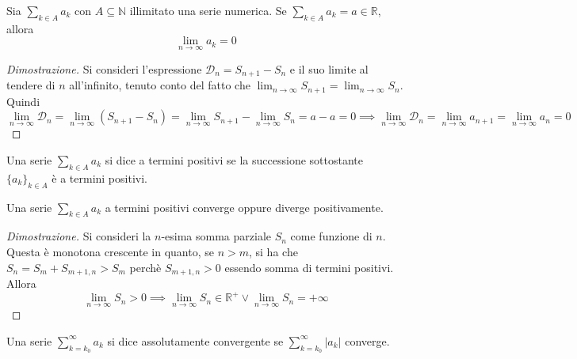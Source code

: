         \begin{theorem}
            Sia $\sum_{k \in A} a_{k}$ con $A \subseteq \mathbb{N}$ illimitato una serie numerica. Se $\sum_{k \in A} a_{k} = a \in \mathbb{R}$, allora
            \[
                \lim_{n \rightarrow \infty} a_{k} = 0
            \]
        \end{theorem}
        \begin{proof}[Dimostrazione]
            Si consideri l'espressione $\mathcal{D}_{n} = S_{n + 1} - S_{n}$ e il suo limite al tendere di $n$ all'infinito, tenuto conto del fatto che $\lim_{n \rightarrow \infty} S_{n + 1} = \lim_{n \rightarrow \infty} S_{n}$.
            Quindi
            \[
                \lim_{n \rightarrow \infty} \mathcal{D}_{n} = \lim_{n \rightarrow \infty} (S_{n + 1} - S_{n}) = \lim_{n \rightarrow \infty} S_{n + 1} - \lim_{n \rightarrow \infty} S_{n} = a - a = 0 \implies \lim_{n \rightarrow \infty} \mathcal{D}_{n} = \lim_{n \rightarrow \infty} a_{n + 1} = \lim_{n \rightarrow \infty} a_{n} = 0
            \]
        \end{proof}

        \begin{definition}
            Una serie $\sum_{k \in A} a_{k}$ si dice a termini positivi se la successione sottostante $\{a_{k}\}_{k \in A}$ è a termini positivi.
        \end{definition}

        \begin{theorem}
            Una serie $\sum_{k \in A} a_{k}$ a termini positivi converge oppure diverge positivamente.
        \end{theorem}
        \begin{proof}[Dimostrazione]
            Si consideri la $n$-esima somma parziale $S_{n}$ come funzione di $n$. Questa è monotona crescente in quanto, se $n > m$, si ha che $S_{n} = S_{m} + S_{m + 1, n} > S_{m}$ perchè $S_{m + 1, n} > 0$ essendo somma di termini positivi.
            Allora
            \[
                \lim_{n \rightarrow \infty} S_{n} > 0 \implies \lim_{n \rightarrow \infty} S_{n} \in \mathbb{R}^{+} \lor \lim_{n \rightarrow \infty} S_{n} = +\infty
            \]

        \end{proof}

        \begin{definition}
            Una serie $\sum_{k = k_{0}}^{\infty} a_{k}$ si dice assolutamente convergente se $\sum_{k = k_{0}}^{\infty} |a_{k}|$ converge.
        \end{definition}

